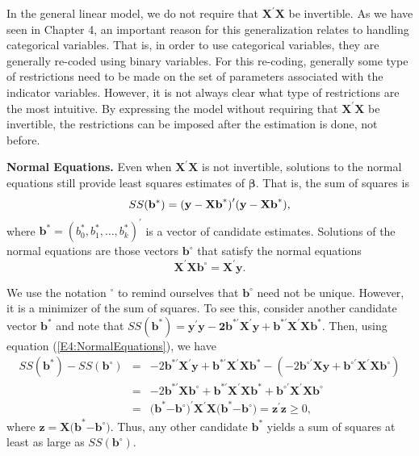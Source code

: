 In the general linear model, we do not require that
$\mathbf{X}^{\prime }\mathbf{X}$ be invertible. As we have seen in
Chapter 4, an important reason for this generalization relates to
handling categorical variables. That is, in order to use categorical
variables, they are generally re-coded using binary variables. For
this re-coding, generally some type of restrictions need to be made
on the set of parameters associated with the indicator variables.
However, it is not always clear what type of restrictions are the
most intuitive. By expressing the model without requiring that $\mathbf{X}%
^{\prime }\mathbf{X}$ be invertible, the restrictions can be imposed
after the estimation is done, not before.

\textbf{Normal Equations.} Even when $\mathbf{X}^{\prime
}\mathbf{X}$ is not invertible, solutions to the normal equations
still provide least squares estimates of $\boldsymbol \beta $. That
is, the sum of squares is
\begin{equation*}
SS(\mathbf{b}^{\ast })=\mathbf{(y-Xb}^{\ast }\mathbf{)}^{\prime }\mathbf{%
(y-Xb}^{\ast }\mathbf{),}
\end{equation*}
where $\mathbf{b}^{\ast }=(b_0^{\ast },b_1^{\ast },\ldots,b_k^{\ast
})^{\prime }$ is a vector of candidate estimates. Solutions of the
normal equations are those vectors $\mathbf{b}^{\circ }$ that
satisfy the normal equations
\begin{equation}\label{E4:NormalEquations}
\mathbf{X}^{\prime }\mathbf{Xb}^{\circ }=\mathbf{X}^{\prime }\mathbf{y.}%
\end{equation}

\noindent We use the notation $^{\circ }$ to remind ourselves that
$\mathbf{b}^{\circ }$ need not be unique. However, it is a minimizer
of the sum of squares. To see
this, consider another candidate vector $\mathbf{b}^{\ast }$ and note that $SS(%
\mathbf{b}^{\ast })=\mathbf{y}^{\prime }\mathbf{y-2b}^{\ast \prime }\mathbf{X%
}^{\prime }\mathbf{y+b}^{\ast \prime }\mathbf{X}^{\prime
}\mathbf{Xb}^{\ast } $. Then, using equation
(\ref{E4:NormalEquations}), we have
\begin{eqnarray*}
SS(\mathbf{b}^{\ast })-SS(\mathbf{b}^{\circ }) &=&-2\mathbf{b}^{\ast \prime }%
\mathbf{X}^{\prime }\mathbf{y}+\mathbf{b}^{\ast \prime }\mathbf{X}^{\prime }%
\mathbf{Xb}^{\ast }-(-2\mathbf{b}^{\circ \prime }\mathbf{Xy}+\mathbf{b}%
^{\circ \prime }\mathbf{X}^{\prime }\mathbf{Xb}^{\circ }) \\
&=&-2\mathbf{b}^{\ast \prime }\mathbf{Xb}^{\circ }+\mathbf{b}^{\ast \prime }%
\mathbf{X}^{\prime }\mathbf{Xb}^{\ast }+\mathbf{b}^{\circ \prime }\mathbf{X}%
^{\prime }\mathbf{Xb}^{\circ } \\
&=&\mathbf{(b}^{\ast }\mathbf{-b}^{\circ }\mathbf{)}^{\prime }\mathbf{X}%
^{\prime }\mathbf{X(b}^{\ast }\mathbf{-b}^{\circ }\mathbf{)}=\mathbf{z}%
^{\prime }\mathbf{z}\geq 0,
\end{eqnarray*}
\noindent where $\mathbf{z}=\mathbf{X(b}^{\ast }\mathbf{-b}^{\circ
}\mathbf{)}$. Thus, any other candidate $\mathbf{b}^{\ast }$ yields
a sum of squares at least as large as $SS(\mathbf{b}^{\circ })$.

